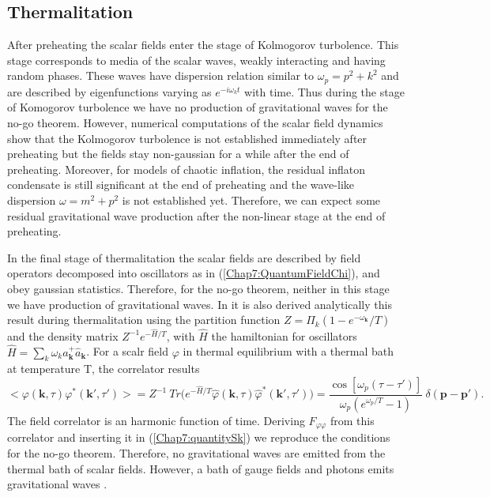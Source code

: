 \documentclass[11pt,a4paper,twoside]{book}
\begin{document}
\subsection{Thermalitation}
After preheating the scalar fields enter the stage of Kolmogorov turbolence. This stage corresponds to media of the scalar waves, weakly interacting and having random phases. These waves have dispersion relation similar to $ \omega_{p}=p^{2}+k^{2} $ and are described by eigenfunctions varying as $ e^{-i\omega_{k} t} $ with time. Thus during the stage of Komogorov turbolence we have no production of gravitational waves for the no-go theorem. However, numerical computations of the scalar field dynamics show that the Kolmogorov turbolence is not established immediately after preheating but the fields stay non-gaussian for a while after the end of preheating. Moreover, for models of chaotic inflation, the residual inflaton condensate is still significant at the end of preheating and the wave-like dispersion  $ \omega=m^{2}+p^{2} $ is not established yet. Therefore, we can expect some residual gravitational wave production after the non-linear stage at the end of preheating.

In the final stage of thermalitation the scalar fields are described by  field operators decomposed into oscillators as in (\ref{Chap7:QuantumFieldChi}), and obey gaussian statistics. Therefore, for the no-go theorem, neither in this stage we have production of gravitational waves. In \cite{Chap7:GreenMethod} it is also derived analytically this result during thermalitation using the partition function $ Z=\Pi_{k}(1-e^{-\omega_{\textbf{k}}}/T) $ and the density matrix $ Z^{-1}e^{-\hat{H}/T} $, with $ \hat{H} $ the hamiltonian for oscillators $ \hat{H}=\sum_{k}\omega_{k} a^{+}_{\textbf{k}} \hat{a}_{\textbf{k}} $. For a scalr field $\varphi$ in thermal equilibrium with a thermal bath at temperature T, the correlator results \cite{Chap7:GreenMethod}
\begin{equation}
\label{Chap7:CorrelatorThermalitation}
<\varphi(\textbf{k},\tau)\varphi^{*}(\textbf{k}',\tau')> = Z^{-1}\ Tr\Bigg(e^{-\hat{H}/T}\hat{\varphi}(\textbf{k},\tau)\hat{\varphi}^*(\textbf{k}',\tau')\Bigg) = \frac{\cos[\omega_{p}(\tau-\tau')]}{\omega_{p}(e^{\omega_{p}/T}-1)}\ \delta(\textbf{p}-\textbf{p}').
\end{equation}
The field correlator is an harmonic function of time. Deriving $ F_{\varphi\varphi} $ from this correlator and inserting it in (\ref{Chap7:quantitySk}) we reproduce the conditions for the no-go theorem.
 Therefore, no gravitational waves are emitted from the thermal bath of scalar fields. However, a bath of gauge fields and photons emits gravitational waves \cite{Chap7:EmissionBathPhotonsGaugeField}.
 
\end{document}
